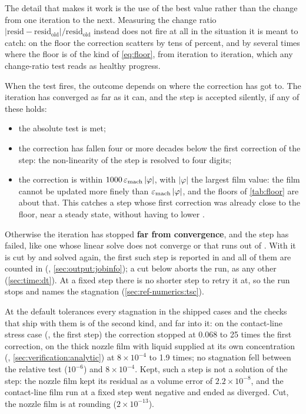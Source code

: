 The detail that makes it work is the use of the best value rather than the
change from one iteration to the next. Measuring the change ratio
$\lvert\mathrm{resid} - \mathrm{resid_{old}}\rvert/\mathrm{resid_{old}}$
instead does not fire at all in the situation it is meant to catch: on the
floor the correction scatters by tens of percent, and by several times where
the floor is of the kind of \cref{eq:floor}, from iteration to iteration,
which any change-ratio test reads as healthy progress.

When the test fires, the outcome depends on where the correction has got to.
The iteration has converged as far as it can, and the step is accepted
silently, if any of these holds:

\begin{itemize}
  \item the absolute test is met;
  \item the correction has fallen four or more decades below the first
    correction of the step: the non-linearity of the step is resolved to
    four digits;
  \item the correction is within $1000\,\varepsilon_{\mathrm{mach}}\,\lvert\varphi\rvert$, with
    $\lvert\varphi\rvert$ the largest film value: the film cannot be updated
    more finely than $\varepsilon_{\mathrm{mach}}\,\lvert\varphi\rvert$, and the floors of
    \cref{tab:floor} are about that. This catches a step whose first
    correction was already close to the floor, near a steady state, without
    having to lower .
\end{itemize}

Otherwise the iteration has stopped \textbf{far from convergence}, and the
step has failed, like one whose linear solve does not converge or that runs
out of . With  it is cut by  and solved again, the first such step is
reported in  and all of them are counted in
 (,
\cref{sec:output:jobinfo}); a cut below  aborts the run, as any
other (\cref{sec:time:dt}). At a fixed step there is no shorter step to retry
it at, so the run stops and names the stagnation
(\cref{sec:ref-numerics:tsc}).

At the default tolerances every stagnation in the shipped cases and the
checks that ship with them is of the second kind, and far into it: on the
contact-line stress case (, the first step) the
correction stopped at 0.068 to 25 times the first correction, on the thick nozzle film
with liquid supplied at its own concentration (,
\cref{sec:verification:analytic}) at $8\times10^{-4}$ to 1.9 times; no
stagnation fell between the relative test ($10^{-6}$) and $8\times10^{-4}$.
Kept, such a step is not a solution of the step: the nozzle film kept its
residual as a volume error of $2.2\times10^{-8}$, and the contact-line film
run at a fixed step went negative and ended as diverged. Cut, the nozzle film
is at rounding ($2\times10^{-13}$).

